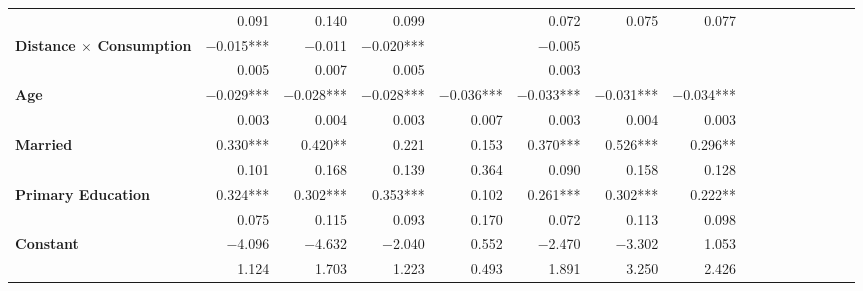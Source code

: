 \begin{tabular}{@{\extracolsep{5pt}}lrrrrrrrrrrrrrrr}
{\bf } & 0.091\phantom{\phantom{)}***} & 0.140\phantom{\phantom{)}***} & 0.099\phantom{\phantom{)}***} & \phantom{***} & 0.072\phantom{\phantom{)}***} & 0.075\phantom{\phantom{)}***} & 0.077\phantom{\phantom{)}***} \\
{\bf Distance $\times$ Consumption} & $-$0.015\phantom{)}*** & $-$0.011\phantom{\phantom{)}***} & $-$0.020\phantom{)}*** & \phantom{***} & $-$0.005\phantom{\phantom{)}***} & \phantom{***} & \phantom{***} \\
{\bf } & 0.005\phantom{\phantom{)}***} & 0.007\phantom{\phantom{)}***} & 0.005\phantom{\phantom{)}***} & \phantom{***} & 0.003\phantom{\phantom{)}***} & \phantom{***} & \phantom{***} \\
{\bf Age} & $-$0.029\phantom{)}*** & $-$0.028\phantom{)}*** & $-$0.028\phantom{)}*** & $-$0.036\phantom{)}*** & $-$0.033\phantom{)}*** & $-$0.031\phantom{)}*** & $-$0.034\phantom{)}*** \\
{\bf } & 0.003\phantom{\phantom{)}***} & 0.004\phantom{\phantom{)}***} & 0.003\phantom{\phantom{)}***} & 0.007\phantom{\phantom{)}***} & 0.003\phantom{\phantom{)}***} & 0.004\phantom{\phantom{)}***} & 0.003\phantom{\phantom{)}***} \\
{\bf Married} & 0.330\phantom{)}*** & 0.420\phantom{)}**\phantom{*} & 0.221\phantom{\phantom{)}***} & 0.153\phantom{\phantom{)}***} & 0.370\phantom{)}*** & 0.526\phantom{)}*** & 0.296\phantom{)}**\phantom{*} \\
{\bf } & 0.101\phantom{\phantom{)}***} & 0.168\phantom{\phantom{)}***} & 0.139\phantom{\phantom{)}***} & 0.364\phantom{\phantom{)}***} & 0.090\phantom{\phantom{)}***} & 0.158\phantom{\phantom{)}***} & 0.128\phantom{\phantom{)}***} \\
{\bf Primary Education} & 0.324\phantom{)}*** & 0.302\phantom{)}*** & 0.353\phantom{)}*** & 0.102\phantom{\phantom{)}***} & 0.261\phantom{)}*** & 0.302\phantom{)}*** & 0.222\phantom{)}**\phantom{*} \\
{\bf } & 0.075\phantom{\phantom{)}***} & 0.115\phantom{\phantom{)}***} & 0.093\phantom{\phantom{)}***} & 0.170\phantom{\phantom{)}***} & 0.072\phantom{\phantom{)}***} & 0.113\phantom{\phantom{)}***} & 0.098\phantom{\phantom{)}***} \\
{\bf Constant} & $-$4.096\phantom{\phantom{)}***} & $-$4.632\phantom{\phantom{)}***} & $-$2.040\phantom{\phantom{)}***} & 0.552\phantom{\phantom{)}***} & $-$2.470\phantom{\phantom{)}***} & $-$3.302\phantom{\phantom{)}***} & 1.053\phantom{\phantom{)}***} \\
{\bf } & 1.124\phantom{\phantom{)}***} & 1.703\phantom{\phantom{)}***} & 1.223\phantom{\phantom{)}***} & 0.493\phantom{\phantom{)}***} & 1.891\phantom{\phantom{)}***} & 3.250\phantom{\phantom{)}***} & 2.426\phantom{\phantom{)}***} \\

\end{tabular}
